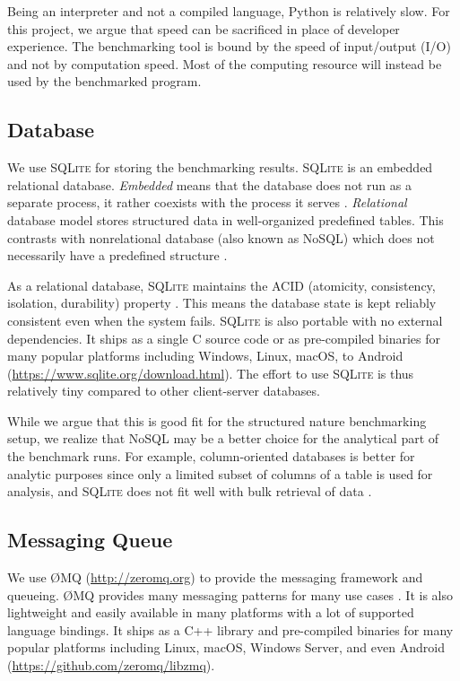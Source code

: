 Being an interpreter and not a compiled language, Python is relatively slow.
For this project, we argue that speed can be sacrificed in place of developer experience.
The benchmarking tool is bound by the speed of input/output (I/O) and not by computation speed.
Most of the computing resource will instead be used by the benchmarked program.


\subsection{Database}

We use \textsc{SQLite} for storing the benchmarking results.
\textsc{SQLite} is an embedded relational database.
\emph{Embedded} means that the database does not run as a separate process, it rather coexists with the process it serves \citep{allenDefinitiveGuideSQLite2010}.
\emph{Relational} database model stores structured data in well-organized predefined tables.
This contrasts with nonrelational database (also known as NoSQL) which does not necessarily have a predefined structure \citep{leavittWillNoSQLDatabases2010}.

As a relational database, \textsc{SQLite} maintains the ACID (atomicity, consistency, isolation, durability) property \citep{leavittWillNoSQLDatabases2010}.
This means the database state is kept reliably consistent even when the system fails.
\textsc{SQLite} is also portable with no external dependencies.
It ships as a single C source code or as pre-compiled binaries for many popular platforms including Windows, Linux, macOS, to Android (\url{https://www.sqlite.org/download.html}).
The effort to use \textsc{SQLite} is thus relatively tiny compared to other client-server databases.

While we argue that this is good fit for the structured nature benchmarking setup, we realize that NoSQL may be a better choice for the analytical part of the benchmark runs.
For example, column-oriented databases is better for analytic purposes since only a limited subset of columns of a table is used for analysis, and \textsc{SQLite} does not fit well with bulk retrieval of data \citep{raasveldtMonetDBLiteEmbeddedAnalytical2018}.

\subsection{Messaging Queue}

We use \O MQ (\url{http://zeromq.org}) to provide the messaging framework and queueing.
\O MQ provides many messaging patterns for many use cases \citep{hintjens2013zeromq}.
It is also lightweight and easily available in many platforms with a lot of supported language bindings.
It ships as a C++ library and pre-compiled binaries for many popular platforms including Linux, macOS, Windows Server, and even Android (\url{https://github.com/zeromq/libzmq}).

